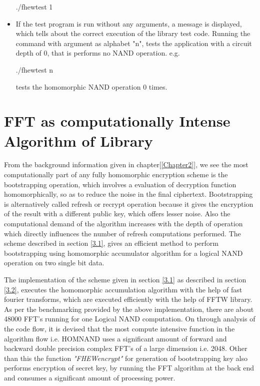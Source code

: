 \begin{itemize}
\hspace{3cm}
./fhewtest 1
\item
If the test program is run without any arguments, a message is displayed, which tells about the correct execution of the library test code. Running the command with argument as alphabet "n", tests the application with a circuit depth of 0, that is performs no NAND operation. e.g.

\hspace{3cm}
./fhewtest n

tests the homomorphic NAND operation 0 times.
\end{itemize}
\section{FFT as computationally Intense Algorithm of Library}
From the background information given in chapter[\ref{Chapter2}], we see the most computationally part of any fully homomorphic encryption scheme is the bootstrapping operation, which involves a evaluation of decryption function homomorphically, so as to reduce the noise in the final ciphertext. Bootstrapping is alternatively called refresh or recrypt operation because it gives the encryption of the result with a different public key, which offers lesser noise. Also the computational demand of the algorithm increases with the depth of operation which directly influences the number of refresh computations performed. The scheme described in section {\ref{3.1}}, gives an efficient method to perform bootstrapping using homomorphic accumulator algorithm for a logical NAND operation on two single bit data. 

The implementation of the scheme given in section {\ref{3.1}} as described in section \ref{3.2}, executes the homomorphic accumulation algorithm with the help of fast fourier transforms, which are executed efficiently with the help of FFTW library. As per the benchmarking provided by the above implementation, there are about 48000 FFT's running for one Logical NAND computation. On through analysis of the code flow, it is devised that the most compute intensive function in the algorithm flow i.e. HOMNAND uses a significant amount of forward and backward double precision complex FFT's of a large dimension i.e. 2048. Other than this the function \textit{"FHEWencrypt"} for generation of bootstrapping key also performs encryption of secret key, by running the FFT algorithm at the back end and consumes a significant amount of processing power.

